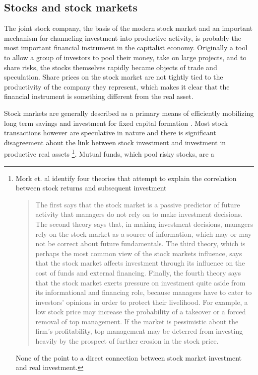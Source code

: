 
\subsection{Stocks and stock markets}
The \gls{joint stock company}, the basis of the modern stock market and an important mechanism for channeling investment  into productive activity,  is probably the most important financial instrument in the capitalist economy. Originally a tool to allow a group of investors to pool their money, take on large projects, and to share risks, the stocks themselves rapidly became objects of trade and speculation. Share prices on the stock market are not tightly tied to the productivity of the company they represent, which makes it clear that the financial instrument is something different from the real asset. 

Stock markets are  generally described as a primary means of efficiently mobilizing long term savings and investment for  fixed capital formation \cite{azfarMarketMobilizedCapital2003}. Most stock transactions however are speculative in nature and there is significant disagreement about the link between stock investment and investment in productive real assets \footnote{Mork et. al \cite{morckStockMarketInvestment1990} identify four theories that attempt to explain the correlation between stock returns and subsequent investment \begin{quotation}The first says that the stock market is a passive predictor of future activity that managers do not rely on to make investment decisions. The second theory says that, in making investment decisions, managers rely on the stock market as a source of information, which may or may not be correct about future fundamentals. The third theory, which is perhaps the most common view of the stock markets influence, says that the stock market affects investment through its influence on the cost of funds and external financing. Finally, the fourth theory says that the stock market exerts pressure on investment quite aside from its informational and financing role, because managers have to cater to investors' opinions in order to protect their livelihood. For example, a low stock price may increase the probability of a takeover or a forced removal of top management. If the market is pessimistic about the firm's profitability, top management may be deterred from investing heavily by the prospect of further erosion in the stock price.\end{quotation} None of the point to a direct connection between stock market investment and real investment.}.  Mutual funds, which pool risky stocks, are a %


